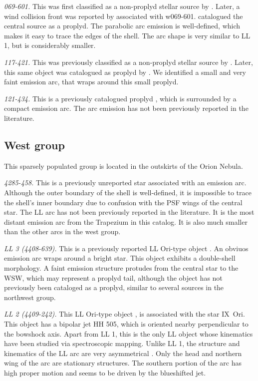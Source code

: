 \documentclass{article}
\begin{document}
\textit{069-601.} This was first classified as a non-proplyd stellar source by \citet{Odell:1996}. Later, a wind collision front was reported  by \citet{Bally:2000a} associated with w069-601. \citet{Ricci:2008} catalogued the central source as a proplyd. The parabolic arc emission is well-defined, which makes it easy to trace the edges of the shell. The arc shape is very similar to LL 1, but is considerably smaller. 

\textit{117-421.} This was previously classified as a non-proplyd stellar source by \citet{Odell:1996}. Later, this same object was catalogued as proplyd by \citet{Ricci:2008}. We identified a small and very faint emission arc, that wraps around this small proplyd. 

\textit{121-434.} This is  a previously catalogued proplyd \citep{Ricci:2008}, which is surrounded by a compact emission arc. The arc emission has not been  previously reported in the literature.

\subsection{West group}
\label{sec:W}

This sparsely populated group is located in the outskirts of the Orion Nebula. 

\textit{4285-458.} This is a previously unreported star associated with an emission arc. Although the outer boundary of the shell is well-defined, it is impossible to trace the shell's inner boundary due to confusion with the PSF wings of the central star. The LL arc has not been previously reported in the literature. It is the most distant emission arc from the Trapezium in this catalog. It is also much smaller than the other arcs in the west group.  

\textit{LL 3 (4408-639).} This is a previously reported LL Ori-type object \citep{Bally:2001}. An obviuos emission arc wraps around a bright star. This object exhibits a double-shell morphology. A faint emission structure protudes from the central star to the WSW, which may represent a proplyd tail, although the object has not previously been cataloged as a proplyd, similar to several sources in the northwest group.    

\textit{LL 2 (4409-242).} This LL Ori-type object \citep{Bally:2001}, is associated with the star IX~Ori. This object has a bipolar jet HH 505, which is oriented nearby perpendicular to the bowshock axis. Apart from LL 1, this is the only LL object whose kinematics have been studied via spectroscopic mapping. Unlike LL 1, the structure and kinematics of the LL arc are very asymmetrical \citep{Henney:2013a}. Only the head and northern wing of the arc are stationary structures. The southern portion of the arc has high proper motion and seems to be driven by the blueshifted jet.  
\end{document}

